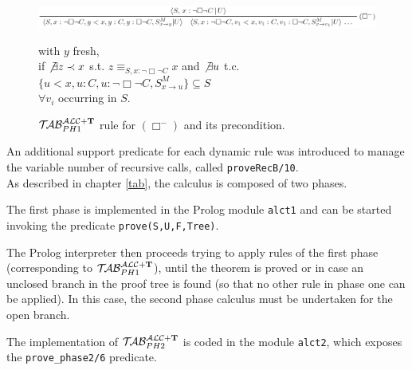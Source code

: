 \documentclass[a4paper, 11pt, oneside]{duthesis}
\newcommand{\tip}{{\bf T}}
\newcommand{\primo}{\mathrel{{\mathcal{T}\!\mathcal{AB}}}_{PH 1}^{\mathcal{ALC}+\mbox{\scriptsize $\tip$}}}
\newcommand{\secondo}{\mathrel{{\mathcal{T}\!\mathcal{AB}}}_{PH 2}^{\mathcal{ALC}+\mbox{\scriptsize $\tip$}}}
\begin{document}
\begin{figure}[htp]
\begin{center}\includegraphics[scale=1.00]{img/box_rule.png}\end{center} %
\begin{flushright} with $y$ fresh,\\
if $\not\exists z \prec x$ s.t. $z \equiv_{S,x:\neg \Box \neg C} x $ and $ \not\exists u$ t.c. $\{u < x, u : C, u : \neg \Box \neg C, S^M_{x\rightarrow u} \} \subseteq S$\\
$\forall v_i$ occurring in $S$.
\normalsize
\end{flushright}
	\caption{$\primo$ rule for $(\Box^-)$ and its precondition.}
	\label{fig_box_rule}
\end{figure}

\newpage

An additional support predicate for each dynamic rule was introduced to manage the variable number of recursive calls, called \texttt{proveRecB/10}.\\

As described in chapter \ref{tab}, the calculus is composed of two phases.

The first phase is implemented in the Prolog module \texttt{alct1} and can be started invoking the predicate \texttt{prove(S,U,F,Tree)}.

The Prolog interpreter then proceeds trying to apply rules of the first phase (corresponding to $\primo$), until the theorem is proved or in case an unclosed branch in the proof tree is found (so that no other rule in phase one can be applied). 
In this case, the second phase calculus must be undertaken for the open branch.

The implementation of $\secondo$ is coded in the module \texttt{alct2}, which exposes the \texttt{prove\_phase2/6} predicate.
\end{document}
